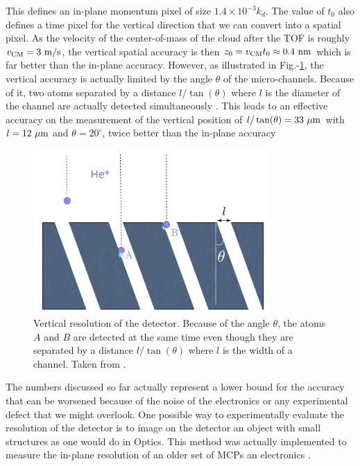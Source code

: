  \noindent This defines an in-plane momentum pixel of size $1.4 \times 10^{-3} k_d$. The value of $t_0$ also defines a time pixel for the vertical direction that we can convert into a spatial pixel. As the velocity of the center-of-mass of the cloud after the TOF is roughly $v_{\rm{CM}}=3 \ \rm{m/s}$, the vertical spatial accuracy is then $z_0 = v_{\rm{CM}} t_0 \approx 0.4 \ \rm{nm}$ which is far better than the in-plane accuracy. However, as illustrated in Fig.-\ref{fig:vertical_resolution}, the vertical accuracy is actually limited by the angle $\theta$ of the micro-channels. Because of it, two atoms separated by a distance $l/\tan(\theta)$ where $l$ is the diameter of the channel are actually detected simultaneously \cite{cayla_these}. This leads to an effective accuracy on the measurement of the vertical position of $l/\tan(\theta)=33 \ \mu\rm{m}$ with $l=12 \ \mu\rm{m}$ and $\theta = 20^{\circ}$, \ie twice better than the in-plane accuracy
 
 
 \begin{figure}
     \centering
     \includegraphics[width=0.8\textwidth]{Fig/Chapter3/vertical_res.png}
     \caption[Vertical resolution of the detector]{Vertical resolution of the detector. Because of the angle $\theta$, the atoms $A$ and $B$ are detected at the same time even though they are separated by a distance $l/\tan(\theta)$ where $l$ is the width of a channel. Taken from \cite{cayla_these}.}
     \label{fig:vertical_resolution}
 \end{figure}
 
The numbers discussed so far actually represent a lower bound for the accuracy that can be worsened because of the noise of the electronics or any experimental defect that we might overlook. One possible way to experimentally evaluate the resolution of the detector is to image on the detector an object with small structures as one would do in Optics. This method was actually implemented to measure the in-plane resolution of an older set of MCPs an electronics \cite{nogrette2015characterization}.

